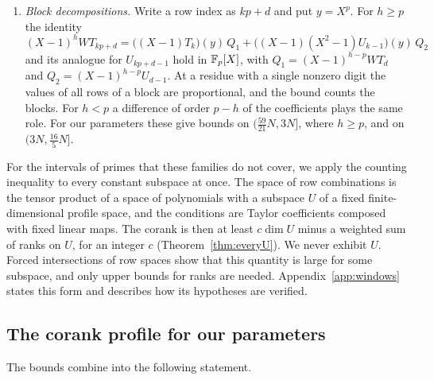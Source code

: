 \begin{enumerate}[label=(F\arabic*),wide]
exists for every $p$ prime to a fixed integer, and the bound is the dimension of the solution space minus
the number of conditions. In two of these families the entries depend only on the residue of the column
modulo $p$, so the difference of order $q$ imposes $(p-q)_+$ conditions. When $h\ge p$ one writes
$(X-1)^h=(X^p-1)(X-1)^{h-p}$, which imposes $h-p$ more conditions. These families give the bounds on
$(\frac{58}{17}N,\frac{59}{17}N]$, $(\frac{29}8N,\frac{11}3N]$, $(\frac{16}7N,\frac52N]$ and on six intervals in
$(\frac{341}{25}N,\frac{809}{50}N]$.
\item \emph{Block decompositions.} Write a row index as $kp+d$ and put $y=X^p$. For $h\ge p$ the identity
\[
 (X-1)^hWT_{kp+d}=\bigl((X-1)T_k\bigr)(y)\,Q_1+\bigl((X-1)(X^2-1)U_{k-1}\bigr)(y)\,Q_2
\]
and its analogue for $U_{kp+d-1}$ hold in $\mathbb F_p[X]$, with $Q_1=(X-1)^{h-p}WT_d$ and $Q_2=(X-1)^{h-p}U_{d-1}$.
At a residue with a single nonzero digit the values of all rows of a block are proportional, and the bound
counts the blocks. For $h<p$ a difference of order $p-h$ of the coefficients plays the same role. For our
parameters these give bounds on $(\frac{59}{21}N,3N]$, where $h\ge p$, and on $(3N,\frac{16}5N]$.
\end{enumerate}

For the intervals of primes that these families do not cover, we apply the counting inequality to every
constant subspace at once. The space of row combinations is the tensor product of a space of polynomials
with a subspace $U$ of a fixed finite-dimensional profile space, and the conditions are Taylor coefficients
composed with fixed linear maps. The corank is then at least $c\dim U$ minus a weighted sum of ranks on $U$, for an integer $c$ (Theorem~\ref{thm:everyU}). We never exhibit $U$. Forced intersections of row spaces show that this quantity is large for some subspace, and only upper bounds for ranks are needed. Appendix~\ref{app:windows} states this form and describes how its
hypotheses are verified.

\subsection{The corank profile for our parameters}\label{ssec:kappa}
The bounds combine into the following statement.

